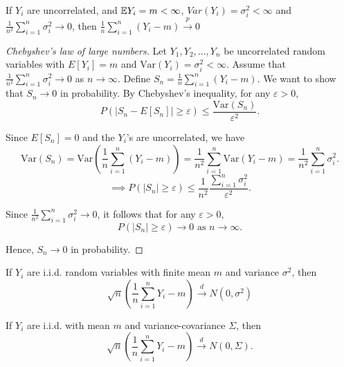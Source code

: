 \documentclass[DIV=14,titlepage=false]{scrreprt}
\begin{document}
\begin{definition}
    If $Y_i$ are uncorrelated, and $\mathbb{E} Y_i = m < \infty$, $Var(Y_i)=\sigma_i^2<\infty$ and $\tfrac{1}{n^2}\sum_{i=1}^{n} \sigma^2_i \to 0$, then $\tfrac{1}{n}\sum_{i=1}^{n} (Y_i-m) \overset{p}{\to}0$
\end{definition}

\begin{proof}[Chebyshev’s law of large numbers]

    Let \( Y_1, Y_2, \ldots, Y_n \) be uncorrelated random variables with \( E[Y_i] = m \) and \( \text{Var}(Y_i) = \sigma^2_i < \infty \). Assume that \( \frac{1}{n^2} \sum_{i=1}^n \sigma^2_i \to 0 \) as \( n \to \infty \). Define \( S_n = \frac{1}{n} \sum_{i=1}^n (Y_i - m) \). We want to show that \( S_n \to 0 \) in probability.
    By Chebyshev's inequality, for any \( \varepsilon > 0 \),
    \[
    P(|S_n - E[S_n]| \geq \varepsilon) \leq \frac{\text{Var}(S_n)}{\varepsilon^2}.
    \]
    
    Since \( E[S_n] = 0 \) and the \( Y_i \)'s are uncorrelated, we have
    \[
    \text{Var}(S_n) = \text{Var}\left(\frac{1}{n} \sum_{i=1}^n (Y_i - m)\right) = \frac{1}{n^2} \sum_{i=1}^n \text{Var}(Y_i - m) = \frac{1}{n^2} \sum_{i=1}^n \sigma^2_i.
    \]
    \[
        \implies
    P(|S_n| \geq \varepsilon) \leq \frac{1}{n^2} \frac{\sum_{i=1}^n \sigma^2_i}{\varepsilon^2}.
    \]
    
    Since \( \frac{1}{n^2} \sum_{i=1}^n \sigma^2_i \to 0 \), it follows that for any \( \varepsilon > 0 \),
    \[
    P(|S_n| \geq \varepsilon) \to 0 \text{ as } n \to \infty.
    \]
    
    Hence, \( S_n \to 0 \) in probability.
\end{proof}

\begin{definition}
    If \( Y_i \) are i.i.d. random variables with finite mean \( m \) and variance \( \sigma^2 \), then
    \[
    \sqrt{n}\left(\frac{1}{n} \sum_{i=1}^{n} Y_i - m\right) \overset{d}{\to} N(0, \sigma^2)
    \]

\end{definition}

\begin{definition}
    If \( Y_i \) are i.i.d. with mean \( m \) and variance-covariance \( \Sigma \), then
    \[
    \sqrt{n}\left(\frac{1}{n} \sum_{i=1}^{n} Y_i - m\right) \overset{d}{\to} N(0, \Sigma).
    \]
\end{definition}
\end{document}
